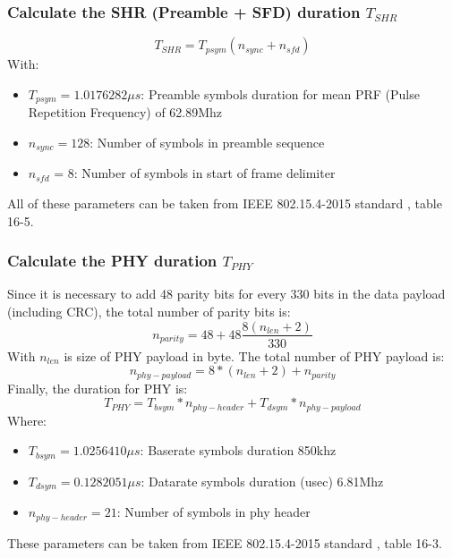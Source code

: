 \documentclass[\main/main.tex]{subfiles}
\begin{document}
\subsubsection{Calculate the SHR (Preamble + SFD) duration $T_{SHR}$}
\begin{equation}
    T_{SHR} = T_{psym}(n_{sync} + n_{sfd})
\end{equation}
With:
\begin{itemize}
    \item $T_{psym} = 1.0176282 \mu s$: Preamble symbols duration for mean PRF (Pulse Repetition Frequency) of 62.89Mhz
    \item $n_{sync} = 128 $: Number of symbols in preamble sequence
    \item $n_{sfd}$ = 8: Number of symbols in start of frame delimiter
\end{itemize}
All of these parameters can be taken from IEEE 802.15.4-2015 standard \cite{IEEE_Std_802_15_4_2015}, table 16-5.

\subsubsection{Calculate the PHY duration $T_{PHY}$}
Since it is necessary to add 48 parity bits for every 330 bits in the data payload (including CRC), the total number of parity bits is:
\begin{equation}
    n_{parity} = 48 + 48\frac{8(n_{len}+2)}{330}
\end{equation}
With $n_{len}$ is size of PHY payload in byte.
The total number of PHY payload is:
\begin{equation}
    n_{phy-payload} = 8*(n_{len}+2) + n_{parity}
\end{equation}
Finally, the duration for PHY is:
\begin{equation}
    T_{PHY} = T_{bsym} * n_{phy-header} + T_{dsym} * n_{phy-payload}
\end{equation}
Where:
\begin{itemize}
    \item $T_{bsym} = 1.0256410 \mu s$: Baserate symbols duration 850khz
    \item $T_{dsym} = 0.1282051 \mu s$: Datarate symbols duration (usec) 6.81Mhz
    \item $n_{phy-header} = 21$: Number of symbols in phy header
\end{itemize}
These parameters can be taken from IEEE 802.15.4-2015 standard \cite{IEEE_Std_802_15_4_2015}, table 16-3.
\end{document}
